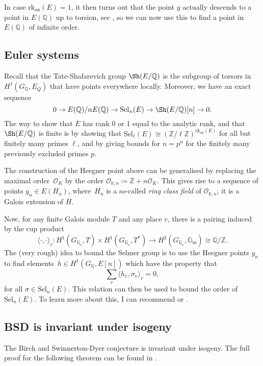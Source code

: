 \documentclass[12pt]{article}
\theoremstyle{definition}
\numberwithin{equation}{subsection}
\newcommand{\Q}{\ensuremath{\mathbb{Q}}}
\newcommand{\Z}{\ensuremath{\mathbb{Z}}}
\begin{document}
In case $\mathrm{rk}_\mathrm{an}(E) = 1$, it then turns out that the point $y$ actually descends to a point in $E(\Q)$ up to torsion, see \cite[Prop.\ 3.11]{Darmon}, so we can now use this to find a point in $E(\Q)$ of infinite order.

\subsection{Euler systems}

Recall that the Tate-Shafarevich group $\Sh(E/\Q)$ is the subgroup of torsors in $H^1(G_\Q, E_{\overline{Q}})$ that have points everywhere locally.
Moreover, we have an exact sequence
$$0 \to E(\Q) / nE(\Q) \to \mathrm{Sel}_n(E) \to \Sh(E/\Q)[n] \to 0.$$
The way to show that $E$ has rank 0 or 1 equal to the analytic rank, and that $\Sh(E/\Q)$ is finite is by showing that $\mathrm{Sel}_\ell(E) \cong (\Z/\ell \Z)^{\mathrm{rk}_{\mathrm{an}}(E)}$ for all but finitely many primes $\ell$, and by giving bounds for $n = p^n$ for the finitely many previously excluded primes $p$.

The construction of the Heegner point above can be generalised by replacing the maximal order~$\mathcal{O}_K$ by the order $\mathcal{O}_{k,n} \coloneqq \Z + n\mathcal{O}_K$.
This gives rise to a sequence of points $y_n \in E(H_n)$, where~$H_n$ is a so-called {\em ring class field} of $\mathcal{O}_{k,n}$; it is a Galois extension of $H$.

Now, for any finite Galois module $T$ and any place $v$, there is a pairing induced by the cup product
$$\langle \cdot, \cdot \rangle_v \colon H^1(G_{\Q_v}, T) \times H^1(G_{\Q_v}, T^*) \to H^2(G_{\Q_v}, \mathbb{G}_{\mathrm{m}}) \cong \Q/\Z.$$
The (very rough) idea to bound the Selmer group is to use the Heegner points $y_n$ to find elements~$h \in H^1(G_\Q, E[n])$ which have the property that 
$$\sum_v \langle h_v, \sigma_v \rangle_v = 0,$$
for all $\sigma \in \mathrm{Sel}_n(E)$.
This relation can then be used to bound the order of $\mathrm{Sel}_n(E)$.
To learn more about this, I can recommend \cite{Darmon} or \cite{RubinBook}.

\subsection{BSD is invariant under isogeny}\label{subsec:isog}

The Birch and Swinnerton-Dyer conjecture is invariant under isogeny.
The full proof for the following theorem can be found in \cite{MilneBook}.
\end{document}
